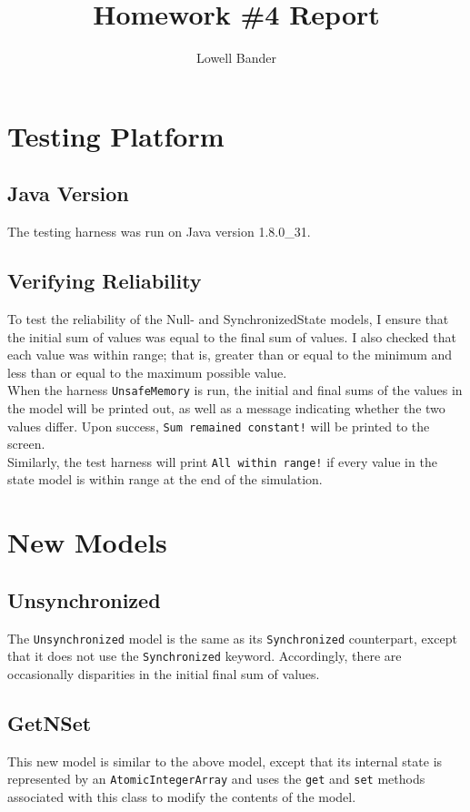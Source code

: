 \documentclass[]{article}
\begin{document}
\title{Homework \#4 Report}
\author{Lowell Bander}
\maketitle

\section{Testing Platform}
\subsection{Java Version}
The testing harness was run on Java version 1.8.0\_31.\\
\subsection{Verifying Reliability}
To test the reliability of the Null- and SynchronizedState models, I ensure that the initial sum of values was equal to the final sum of values. I also checked that each value was within range; that is, greater than or equal to the minimum and less than or equal to the maximum possible value.\\

When the harness \texttt{UnsafeMemory} is run, the initial and final sums of the values in the model will be printed out, as well as a message indicating whether the two values differ. Upon success, \texttt{Sum remained constant!} will be printed to the screen.\\

Similarly, the test harness will print \texttt{All within range!} if every value in the state model is within range at the end of the simulation.
\section{New Models}
\subsection{Unsynchronized}
The \texttt{Unsynchronized} model is the same as its \texttt{Synchronized} counterpart, except that it does not use the \texttt{Synchronized} keyword. Accordingly, there are occasionally disparities in the initial final sum of values.
\subsection{GetNSet}
This  new model is similar to the above model, except that its internal state is represented by an \texttt{AtomicIntegerArray} and uses the \texttt{get} and \texttt{set} methods associated with this class to modify the contents of the model.
\end{document}

